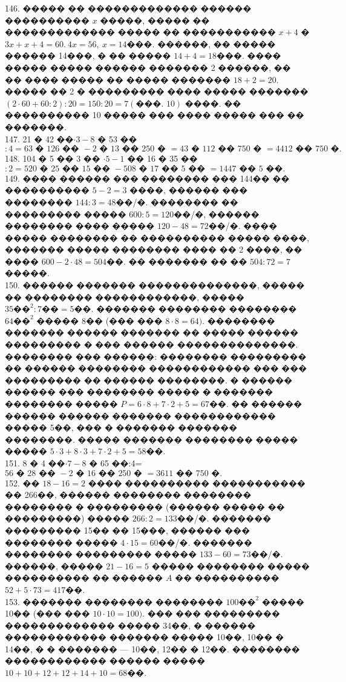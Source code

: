 \documentclass[12pt]{article}
\begin{document}
146. ����� �� ������������� ������ ���������� $x$ �����, ����� �� ������������� ����� �� ����������� $x+4$ � $3x+x+4=60.\ 4x=56,\ x=14$���. ������, �� ����� ������ 14���, � �� ����� $14+4=18$���. ���� ����� ����� ������ ������� 2 ������, �� �� ���� ����� �� ����� ������� $18+2=20.$ ����� �� 2 � ��������� ���� ����� ������� $(2\cdot60+60:2):20=150:20=7 (\text{���. 10})$ ����. �� ���������� 10 ����� ��� ���� ����� ��� �� �������.\\
147. 21 � 42 ��$\cdot3-8$ � 53 ��$:4=63\text{ � }126\text{ �� }-2\text{ � }13\text{ �� }250\text{ � }=43\text{ � }112\text{ �� }750\text{ � }=4412\text{ �� }750\text{ �}.$\\
148. 104 � 5 �� 3 �� $\cdot 5-1$ �� 16 � 35 ��$:2=520\text{ � }25\text{ �� }15\text{ �� }-508\text{ � }17\text{ �� }5\text{ �� }=1447\text{ �� }5\text{ ��}.$\\
149. ���� ������ ��� �������� ��� 144�� �� ���������� $5-2=3$ ����, ������ ��� �������� $144:3=48$��/�. �������� �� ��������� ����� $600:5=120$��/�, ������ �������� ���� ����� $120-48=72$��/�. ���� ����� �������� �� ���������� ����� ����, ������� ����� �������� ���� �� 2 ����, �� ���� $600-2\cdot48=504$��. �� ������� �� �� $504:72=7$ �����.\\
150. ������ ������� ��������������, ����� �� �������� ������������, ����� $35\text{��}^2:7\text{��}=5$��. ������� �������� �������� $64\text{��}^2$ ����� 8�� (��� ��� $8\cdot8=64).$ �������� ������� ������ ������� �� ����� ������ ��������� � ��� ������ ��������������. �������� ��� ������: �������� ��������� �� ������ �������� ������������ ��� ��� ��������� �� ������ ��������. � ������ ������ ��� �������� ����� � ������� �������� ����� $P=6\cdot8+7\cdot2+5=67$��. �� ������ ������ ������ ������� ������������ ����� 5��, ��� � ������� ������� ��������. ����� ������� �������� ����� ����� $5\cdot3+8\cdot3+7\cdot2+5=58$��.\\
151. 8 � 4 ��$\cdot7-8$ � 65 ��:4=$56\text{ � }28\text{ �� }-2\text{ � }16\text{ �� }250\text{ � }=3611\text{ �� }750\text{ �.}$\\
152. �� $18-16=2$ ���� ���������� ����������� �� 266��, ������ �������� �������� �������� � ��������� (������ ����� �� ���������) ����� $266:2=133$��/�. ������� ��������� 15�� �� 15���, ������ ��� �������� ����� $4\cdot15=60$��/�. ������� �������� ��������� ����� $133-60=73$��/�. ������, ����� $21-16=5$ ����� �������� ����� ���������� �� ������ $A$ �� ���������� $52+5\cdot73=417$��.\\
153. ������� �������� �������� $100\text{��}^2$ ����� 10�� (��� ��� $10\cdot10=100).$ ��� ��� ��������� ������������� ����� 34��, � ������ ������������ ������� ����� 10��, 10�� � 14��, � � ������� --- 10��, 12�� � 12��. �������� ������������ ������ ����� $10+10+12+12+14+10=68$��.\\
\end{document}
